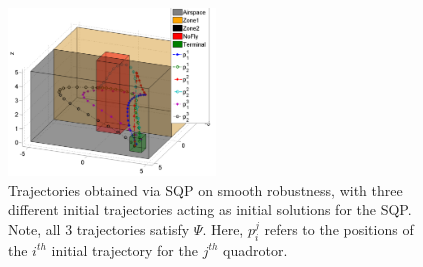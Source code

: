 \begin{figure}[t]
\centering
\includegraphics[width=0.49\textwidth]{figures/QuadTrajs_scissored}
\caption{ Trajectories obtained via SQP on smooth robustness, with three different initial trajectories acting as initial solutions for the SQP. Note, all 3 trajectories satisfy $\Psi$. Here, $p_{i}^j$ refers to the positions of the $i^{th}$ initial trajectory for the $j^{th}$ quadrotor.}
\label{fig:quad_ssqp}
\end{figure}




